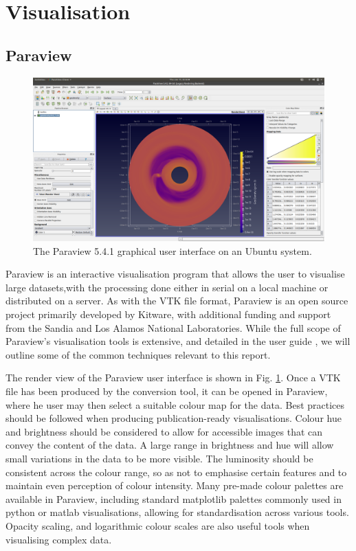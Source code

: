 \documentclass[preprint2]{aastex62}
\begin{document}
\section{Visualisation}
\subsection{Paraview}
\begin{figure}
	\includegraphics[width=\linewidth]{figures/Presentation/paraview.png}
	\caption{\label{fig:pviewinter}The Paraview 5.4.1 graphical user interface on an Ubuntu system.}
\end{figure}
Paraview is an interactive visualisation program that allows the user to visualise large datasets,with the processing done either in serial on a local machine or distributed on a server.
As with the VTK file format, Paraview is an open source project primarily developed by Kitware, with additional funding and support from the Sandia and Los Alamos National Laboratories.
While the full scope of Paraview's visualisation tools is extensive, and detailed in the user guide \cite{para}, we will outline some of the common techniques relevant to this report.

The render view of the Paraview user interface is shown in Fig. \ref{fig:pviewinter}.
Once a VTK file has been produced by the conversion tool, it can be opened in Paraview, where he user may then select a suitable colour map for the data. 
Best practices should be followed when producing publication-ready visualisations. Colour hue and brightness should be considered to allow for accessible images that can convey the content of the data. A large range in brightness and hue will allow small variations in the data to be more visible. 
The luminosity should be consistent across the colour range, so as not to emphasise certain features and to maintain even perception of colour intensity. 
Many pre-made colour palettes are available in Paraview, including standard matplotlib palettes commonly used in python or matlab visualisations, allowing for standardisation across various tools.
Opacity scaling, and logarithmic colour scales are also useful tools when visualising complex data.
\end{document}
